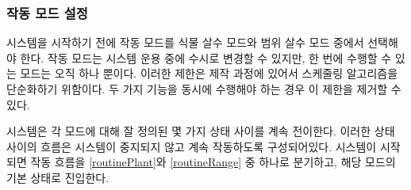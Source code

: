 \documentclass[chapter,11pt,oneside,openany]{xoblivoir}
\begin{document}
\subsubsection{작동 모드 설정}
시스템을 시작하기 전에 작동 모드를 식물 살수 모드와 범위 살수 모드 중에서 선택해야 한다.
작동 모드는 시스템 운용 중에 수시로 변경할 수 있지만, 한 번에 수행할 수 있는 모드는 오직 하나 뿐이다.
이러한 제한은 제작 과정에 있어서 스케줄링 알고리즘을 단순화하기 위함이다.
두 가지 기능을 동시에 수행해야 하는 경우 이 제한을 제거할 수 있다.

시스템은 각 모드에 대해 잘 정의된 몇 가지 상태 사이를 계속 전이한다.
이러한 상태 사이의 흐름은 시스템이 중지되지 않고 계속 작동하도록 구성되어있다.
시스템이 시작되면 작동 흐름을 \ref{routinePlant}와 \ref{routineRange} 중 하나로 분기하고,
해당 모드의 기본 상태로 진입한다.

\clearpage
\end{document}
